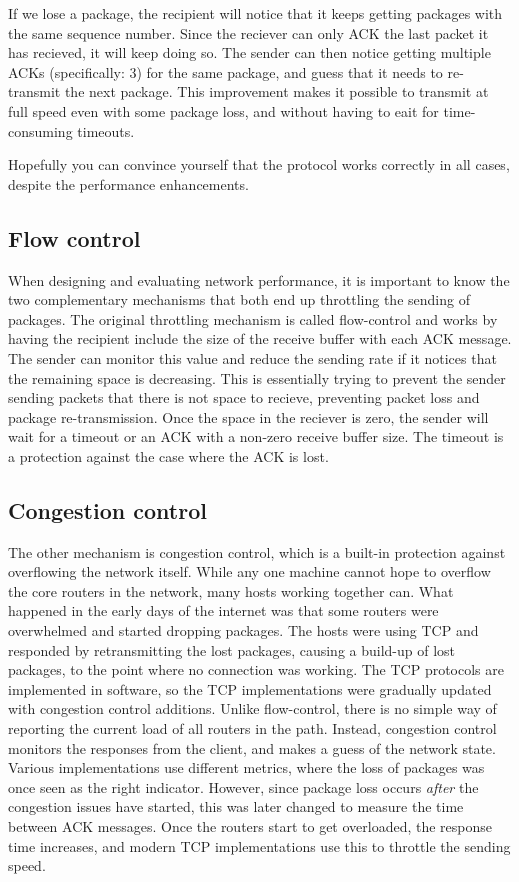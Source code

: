 If we lose a package, the recipient will notice that it keeps getting packages with the same sequence number. Since the reciever can only ACK the last packet it has recieved, it will keep doing so. The sender can then notice getting multiple ACKs (specifically: 3) for the same package, and guess that it needs to re-transmit the next package. This improvement makes it possible to transmit at full speed even with some package loss, and without having to eait for time-consuming timeouts.

Hopefully you can convince yourself that the protocol works correctly in all cases, despite the performance enhancements.

\subsection{Flow control}
When designing and evaluating network performance, it is important to know the two complementary mechanisms that both end up throttling the sending of packages. The original throttling mechanism is called flow-control and works by having the recipient include the size of the receive buffer with each ACK message. The sender can monitor this value and reduce the sending rate if it notices that the remaining space is decreasing. This is essentially trying to prevent the sender sending packets that there is not space to recieve, preventing packet loss and package re-transmission. Once the space in the reciever is zero, the sender will wait for a timeout or an ACK with a non-zero receive buffer size. The timeout is a protection against the case where the ACK is lost. 

\subsection{Congestion control}
The other mechanism is congestion control, which is a built-in protection against overflowing the network itself. While any one machine cannot hope to overflow the core routers in the network, many hosts working together can. What happened in the early days of the internet was that some routers were overwhelmed and started dropping packages. The hosts were using TCP and responded by retransmitting the lost packages, causing a build-up of lost packages, to the point where no connection was working. The TCP protocols are implemented in software, so the TCP implementations were gradually updated with congestion control additions. Unlike flow-control, there is no simple way of reporting the current load of all routers in the path. Instead, congestion control monitors the responses from the client, and makes a guess of the network state. Various implementations use different metrics, where the loss of packages was once seen as the right indicator. However, since package loss occurs \emph{after} the congestion issues have started, this was later changed to measure the time between ACK messages. Once the routers start to get overloaded, the response time increases, and modern TCP implementations use this to throttle the sending speed.

